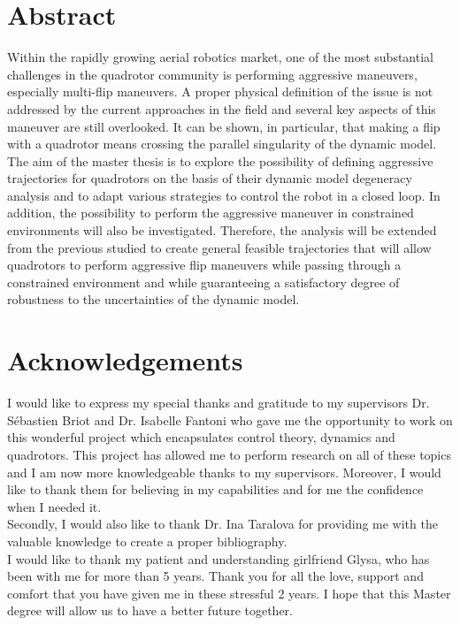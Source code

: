 \documentclass{thesisreport}
\begin{document}
   
 
  \section*{Abstract}
Within the rapidly growing aerial robotics market, one of the most substantial challenges in the quadrotor community is performing aggressive maneuvers, especially multi-flip maneuvers.  A proper physical definition of the issue is not addressed by the current approaches in the field and several key aspects of this maneuver are still overlooked.
It can be shown, in particular, that making a flip with a quadrotor means crossing the parallel singularity of the dynamic model. The aim of the master thesis is to explore the possibility of defining aggressive trajectories for quadrotors on the basis of their dynamic model degeneracy analysis and to adapt various strategies to control the robot in a closed loop. In addition, the possibility to perform the aggressive maneuver in constrained environments will also be investigated.
Therefore, the analysis will be extended from the previous studied to create general feasible trajectories that will allow quadrotors to perform aggressive flip maneuvers while passing through a constrained environment and while guaranteeing a satisfactory degree of robustness to the uncertainties of the dynamic model.

 
 \newpage
 
 \section*{Acknowledgements}


I would like to express my special thanks and gratitude to my supervisors Dr. Sébastien Briot and Dr. Isabelle Fantoni who gave me the  opportunity to work on this wonderful project which encapsulates control theory, dynamics and quadrotors. This project has allowed me to perform research on all of these topics and I am now more knowledgeable thanks to my supervisors. Moreover, I would like to thank them for believing in my capabilities and for me the confidence when I needed it. \\

Secondly, I would also like to thank Dr. Ina Taralova for providing me with the valuable knowledge to create a proper bibliography. \\


I would like to thank my patient and understanding girlfriend Glysa, who has been with me for more than 5 years. Thank you for all the love, support and comfort that you have given me in these stressful 2 years. I hope that this Master degree will allow us to have a better future together. \\
\end{document}
